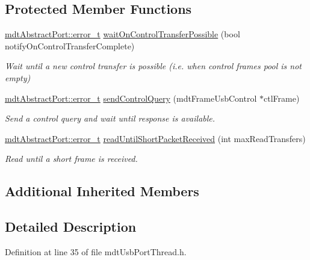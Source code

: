 \subsection*{Protected Member Functions}
\begin{DoxyCompactItemize}
\item 
\hyperlink{classmdt_abstract_port_ad4121bb930c95887e77f8bafa065a85e}{mdt\-Abstract\-Port\-::error\-\_\-t} \hyperlink{classmdt_usb_port_thread_a2d234f3900b502ecced6897facdcf029}{wait\-On\-Control\-Transfer\-Possible} (bool notify\-On\-Control\-Transfer\-Complete)
\begin{DoxyCompactList}\small\item\em Wait until a new control transfer is possible (i.\-e. when control frames pool is not empty) \end{DoxyCompactList}\item 
\hyperlink{classmdt_abstract_port_ad4121bb930c95887e77f8bafa065a85e}{mdt\-Abstract\-Port\-::error\-\_\-t} \hyperlink{classmdt_usb_port_thread_ae154415b3f311b02934405cd58eb9aa5}{send\-Control\-Query} (mdt\-Frame\-Usb\-Control $\ast$ctl\-Frame)
\begin{DoxyCompactList}\small\item\em Send a control query and wait until response is available. \end{DoxyCompactList}\item 
\hyperlink{classmdt_abstract_port_ad4121bb930c95887e77f8bafa065a85e}{mdt\-Abstract\-Port\-::error\-\_\-t} \hyperlink{classmdt_usb_port_thread_acca2af9704cc6894ec5b2058ca102af1}{read\-Until\-Short\-Packet\-Received} (int max\-Read\-Transfers)
\begin{DoxyCompactList}\small\item\em Read until a short frame is received. \end{DoxyCompactList}\end{DoxyCompactItemize}
\subsection*{Additional Inherited Members}


\subsection{Detailed Description}


Definition at line 35 of file mdt\-Usb\-Port\-Thread.\-h.



